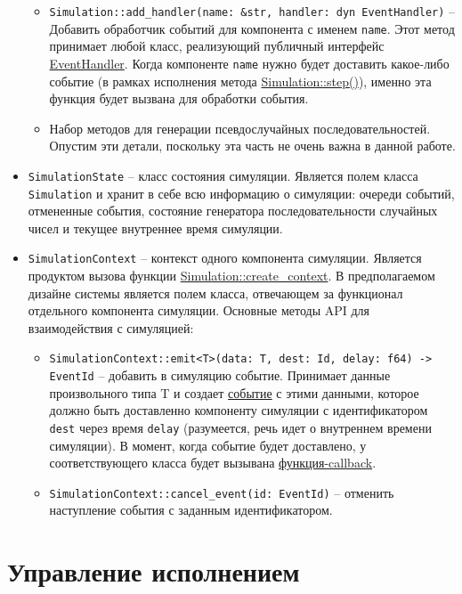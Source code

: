 \begin{itemize}
\begin{itemize}
        \item \texttt{Simulation::add\_handler(name: \&str, handler: dyn EventHandler)} -- Добавить обработчик событий для компонента с именем \texttt{name}.
        Этот метод принимает любой класс, реализующий публичный интерфейс \hyperref[EventHandler]{EventHandler}. Когда компоненте \texttt{name} нужно будет доставить какое-либо событие (в рамках исполнения метода \hyperref[Simulation::step]{Simulation::step()}), именно эта функция будет вызвана для обработки события.
        \item Набор методов для генерации псевдослучайных последовательностей. Опустим эти детали, поскольку эта часть не очень важна в данной работе.
    \end{itemize}
    \item \texttt{SimulationState} -- класс состояния симуляции. Является полем класса \texttt{Simulation} и хранит в себе всю информацию о симуляции: очереди событий, отмененные события, состояние генератора последовательности случайных чисел и текущее внутреннее время симуляции.
    \item \texttt{SimulationContext} -- контекст одного компонента симуляции. Является продуктом вызова функции \hyperref[Simulation::createcontext]{Simulation::create\_context}. В предполагаемом дизайне системы является полем класса, отвечающем за функционал отдельного компонента симуляции. Основные методы API для взаимодействия с симуляцией:
    \begin{itemize}
        \item \texttt{SimulationContext::emit<T>(data: T, dest: Id, delay: f64) -> EventId} -- добавить в симуляцию событие. Принимает данные произвольного типа T и создает \hyperref[Event]{событие} с этими данными, которое должно быть доставленно компоненту симуляции с идентификатором \texttt{dest} через время \texttt{delay} (разумеется, речь идет о внутреннем времени симуляции). В момент, когда событие будет доставлено, у соответствующего класса будет вызывана \hyperref[fnon]{функция-callback}.
        \item \texttt{SimulationContext::cancel\_event(id: EventId)} -- отменить наступление события с заданным идентификатором. \label{SimulationContext} 
    \end{itemize}
\end{itemize}


\section{Управление исполнением}


